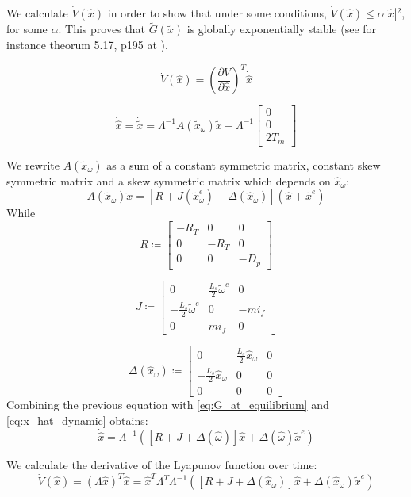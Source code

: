 \documentclass[letterpaper, 10 pt, conference]{ieeeconf}
\begin{document}
We calculate $\dot{V}(\hat{x})$ in order to show that under some
conditions, $\dot{V}(\hat{x})\leq\alpha|\hat{x}|{}^{2}$, for some
$\alpha.$ This  proves that $\tilde{G}(\tilde{x})$ is globally
exponentially stable (see for instance theorum 5.17, p195 at \cite{Sastry}).

$$
\dot{V}(\hat{x})=\left(\frac{\partial V}{\partial\hat{x}}\right)^{T}\dot{\hat{x}}
$$

\begin{equation}
\dot{\hat{x}}=\dot{\tilde{x}}=\varLambda^{-1}A(\tilde{x}_\omega)\tilde{x}+\varLambda^{-1}\left[\begin{array}{c}
0\\
0\\
2T_{m}
\end{array}\right]\label{eq:x_hat_dynamic}
\end{equation}
 
We rewrite  $A(\tilde{x}_{\omega})$ as a sum of a constant symmetric
matrix, constant skew symmetric matrix and a skew symmetric matrix
which depends on $\hat{x}_{\omega}$:
$$ 
A(\tilde{x}_{\omega})\tilde{x}=\left[R+J(\tilde{x}_{\omega}^{e})+\Delta(\hat{x}_{\omega})\right](\hat{x}+\tilde{x}^{e})
$$
While
$$
R\coloneqq\left[\begin{array}{ccc}
-R_T & 0 & 0\\
0 & -R_T & 0\\
0 & 0 & -D_{p}
\end{array}\right]
$$

$$
J\coloneqq\left[\begin{array}{ccc}
0 & \frac{L_{s}}{2}\tilde{\omega}^{e} & 0\\
-\frac{L_{s}}{2}\tilde{\omega}^{e} & 0 & -mi_f\\
0 & mi_{f} & 0
\end{array}\right]
$$

$$
\Delta(\hat{x}_{\omega})\coloneqq\left[\begin{array}{ccc}
0 & \frac{L_{s}}{2}\hat{x}_{\omega} & 0\\
-\frac{L_{s}}{2}\hat{x}_{\omega} & 0 & 0\\
0 & 0 & 0
\end{array}\right]
$$
Combining the previous equation with \eqref{eq:G_at_equilibrium} and \eqref{eq:x_hat_dynamic}
obtains: 
$$
\dot{\hat{x}}=\Lambda^{-1}\left( \left[R+J+\Delta(\hat{\omega})\right]\hat{x}+\Delta(\hat{\omega})\tilde{x}^{e}\right) 
$$

We calculate the derivative of the Lyapunov function over  time: 
$$
\dot{V}(\hat{x})=\left(\Lambda\hat{x}\right)^{T}\dot{\hat{x}}=\hat{x}^{T}\Lambda^{T}\Lambda^{-1}\left( \left[R+J+\Delta(\hat{x}_{\omega})\right]\hat{x}+\Delta(\hat{x}_{\omega})\tilde{x}^{e}\right)
$$
\end{document}
